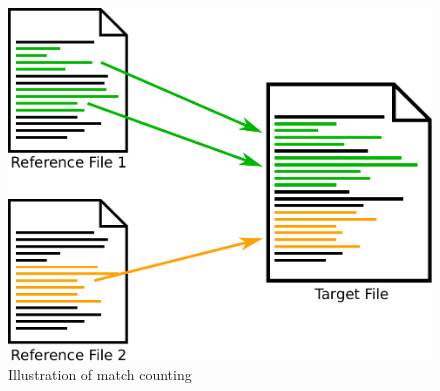 \begin{figure}
	\centering
	\includegraphics[width=0.8\linewidth]{figures/match_counting.pdf}
	\caption{Illustration of match counting}\label{fig:match_counting}
\end{figure}


